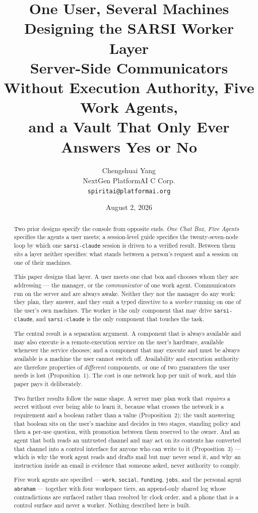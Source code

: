 \documentclass[11pt]{article}
\title{\LARGE One User, Several Machines\\[6pt]
\Large Designing the SARSI Worker Layer\\[4pt]
\large Server-Side Communicators Without Execution Authority, Five Work Agents,\\
\large and a Vault That Only Ever Answers Yes or No}
\author{Chengshuai Yang\\
\small NextGen PlatformAI C Corp.\\
\small \texttt{spiritai@platformai.org}}
\date{August 2, 2026}
\newcommand{\code}[1]{\texttt{\small #1}}
\begin{document}
\maketitle
\thispagestyle{empty}

\begin{abstract}
\noindent
Two prior designs specify the console from opposite ends. \emph{One Chat Box, Five Agents} specifies the agents a user meets; a session-level guide specifies the twenty-seven-node loop by which one \code{sarsi-claude} session is driven to a verified result. Between them sits a layer neither specifies: what stands between a person's request and a session on one of their machines.

This paper designs that layer. A user meets one chat box and chooses whom they are addressing --- the manager, or the \emph{communicator} of one work agent. Communicators run on the server and are always awake. Neither they nor the manager do any work: they plan, they answer, and they emit a typed directive to a \emph{worker} running on one of the user's own machines. The worker is the only component that may drive \code{sarsi-claude}, and \code{sarsi-claude} is the only component that touches the task.

The central result is a separation argument. A component that is always available and may also execute is a remote-execution service on the user's hardware, available whenever the service chooses; and a component that may execute and must be always available is a machine the user cannot switch off. Availability and execution authority are therefore properties of \emph{different} components, or one of two guarantees the user needs is lost (Proposition~1). The cost is one network hop per unit of work, and this paper pays it deliberately.

Two further results follow the same shape. A server may plan work that \emph{requires} a secret without ever being able to learn it, because what crosses the network is a requirement and a boolean rather than a value (Proposition~2); the vault answering that boolean sits on the user's machine and decides in two stages, standing policy and then a per-use question, with promotion between them reserved to the owner. And an agent that both reads an untrusted channel and may act on its contents has converted that channel into a control interface for anyone who can write to it (Proposition~3) --- which is why the work agent reads and drafts mail but may never send it, and why an instruction inside an email is evidence that someone asked, never authority to comply.

Five work agents are specified --- \code{work}, \code{social}, \code{funding}, \code{jobs}, and the personal agent \code{abraham} --- together with four workspace tiers, an append-only shared log whose contradictions are surfaced rather than resolved by clock order, and a phone that is a control surface and never a worker. Nothing described here is built.
\end{abstract}
\end{document}
